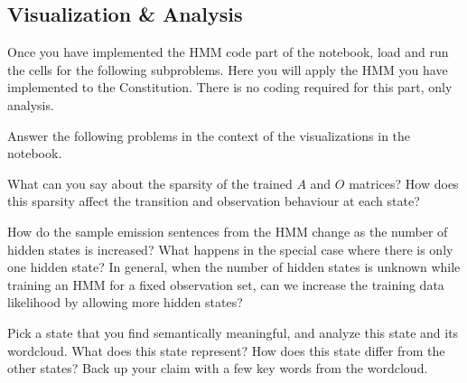 \subsection{Visualization \& Analysis}

Once you have implemented the HMM code part of the notebook, load and run the cells for the following subproblems. Here you will apply the HMM you have implemented to the Constitution. There is no coding required for this part, only analysis.

Answer the following problems in the context of the visualizations in the notebook.

\indent\problem[3] %
What can you say about the sparsity of the trained $A$ and $O$ matrices? How does this sparsity affect the transition and observation behaviour at each state?
\begin{solution}
\end{solution}

\indent\problem[5] %
How do the sample emission sentences from the HMM change as the number of hidden states is increased? What happens in the special case where there is only one hidden state? In general, when the number of hidden states is unknown while training an HMM for a fixed observation set, can we increase the training data likelihood by allowing more hidden states?

\begin{solution}
\end{solution}


\indent\problem[5] %
Pick a state that you find semantically meaningful, and analyze this state and its wordcloud. What does this state represent? How does this state differ from the other states? Back up your claim with a few key words from the wordcloud.
\begin{solution}
\end{solution}




